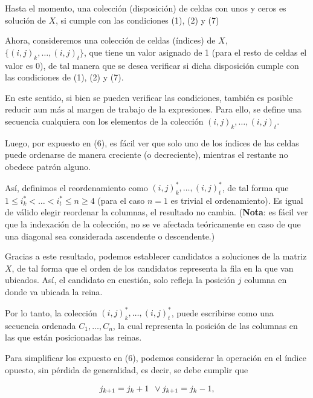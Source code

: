\documentclass[letterpaper,11pt,spanish]{article}
\begin{document}
Hasta el momento, una colección (disposición) de celdas con unos y ceros es solución de $X$, si cumple con las condiciones (1), (2) y (7)

Ahora, consideremos una colección de celdas (índices) de $X$, $\lbrace (i,j)_k,\ldots,(i,j)_t \rbrace$, que tiene un valor asignado de 1 (para el resto de celdas el valor es 0), de tal manera que se desea verificar si dicha disposición cumple con las condiciones de (1), (2) y (7). 

En este sentido, si bien se pueden verificar las condiciones, también es posible reducir aun más al margen de trabajo de la expresiones. Para ello, se define una secuencia cualquiera con los elementos de la colección $(i,j)_k,\ldots,(i,j)_t$. 

Luego, por expuesto en (6), es fácil ver que solo uno de los índices de las celdas puede ordenarse de manera creciente (o decreciente), mientras el restante no obedece patrón alguno.

Así, definimos el reordenamiento como $(i,j)_k^*,\ldots,(i,j)_t^*$, de tal forma que $1\leq i_k^*<\ldots < i_t^*\leq n \geq 4$ (para el caso $n=1$ es trivial el ordenamiento). Es igual de válido elegir reordenar la columnas, el resultado no cambia. (\textbf{Nota}: es fácil ver que la indexación de la colección, no se ve afectada teóricamente en caso de que una diagonal sea considerada ascendente o descendente.)

Gracias a este resultado, podemos establecer candidatos a soluciones de la matriz $X$, de tal forma que el orden de los candidatos representa la fila en la que van ubicados. Así, el candidato en cuestión, solo refleja la posición $j$ columna en donde va ubicada la reina.

Por lo tanto, la colección $(i,j)_k^*,\ldots,(i,j)_t^*$, puede escribirse como una secuencia ordenada $C_1,\ldots,C_n$, la cual representa la posición de las columnas en las que están posicionadas las reinas.

Para simplificar los expuesto en (6), podemos considerar la operación  en el índice opuesto, sin pérdida de generalidad, es decir, se debe cumplir que

\begin{equation}
\begin{matrix}
j_{k+1} = j_k+1\\
\end{matrix}\\ \vee
\begin{matrix}
j_{k+1} = j_k-1\\
\end{matrix},
\end{equation}
\end{document}
